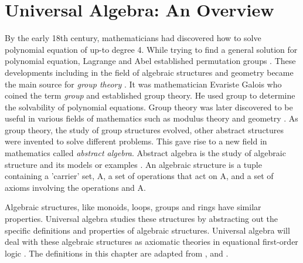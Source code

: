 \chapter{Universal Algebra: An Overview}
By the early 18th century, mathematicians had discovered how to solve polynomial
equation of up-to degree 4. While trying to find a general solution for
polynomial equation, Lagrange and Abel established permutation groups
\cite{barnett2017roots}. These developments including in the field of algebraic
structures and geometry became the main source for \textit{group theory}
\cite{enwiki:1145792803}. It was mathematician Evariste Galois who coined the
term \emph{group} and established group theory. He used group to determine the
solvability of polynomial equations. Group theory was later discovered to be
useful in various fields of mathematics such as modulus theory and geometry
\cite{enwiki:1107380309}. As group theory, the study of group structures
evolved, other abstract structures were invented to solve different problems.
This gave rise to a new field in mathematics called \emph{abstract algebra}.
Abstract algebra is the study of algebraic structure and its models or examples
\cite{enwiki:1107380309}. An algebraic structure is a tuple containing a
'carrier' set, A, a set of operations that act on A, and a set of axioms
involving the operations and A. 

Algebraic structures, like monoids, loops, groups and rings have similar
properties. Universal algebra studies these structures by abstracting out the
specific definitions and properties of algebraic structures. Universal algebra
will deal with these algebraic structures as axiomatic theories in equational
first-order logic \cite{YSharoda}. The definitions in this chapter are adapted
from \cite{sankappanavar1981course}, \cite{YSharoda} and
\cite{sannella2012foundations}.

